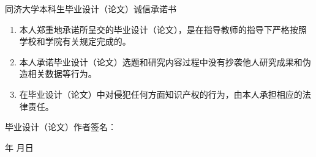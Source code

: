 \newpage
\thispagestyle{empty}

\begin{center}
	\heiti\xiaosan 同济大学本科生毕业设计（论文）诚信承诺书
\end{center}

\vspace{5mm}

{\songti\sihao
\begin{enumerate}
	\item 本人郑重地承诺所呈交的毕业设计（论文），是在指导教师的指导下严格按照学校和学院有关规定完成的。
	\item 本人承诺毕业设计（论文）选题和研究内容过程中没有抄袭他人研究成果和伪造相关数据等行为。
	\item 在毕业设计（论文）中对侵犯任何方面知识产权的行为，由本人承担相应的法律责任。
\end{enumerate}
\vspace{20mm}
\hspace{20mm}毕业设计（论文）作者签名：
\begin{flushright}
	\underline{\hspace{4em}} 年 \underline{\hspace{2em}}月\underline{\hspace{2em}}日
\end{flushright}
}

